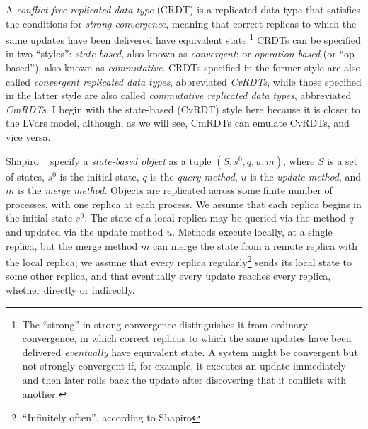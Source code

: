\documentclass{article}
\begin{document}
A \emph{conflict-free replicated data type} (CRDT) is a replicated
data type that satisfies the conditions for \emph{strong convergence},
meaning that correct replicas to which the same updates have been
delivered have equivalent state.\footnote{The ``strong'' in strong
  convergence distinguishes it from ordinary convergence, in which
  correct replicas to which the same updates have been delivered
  \emph{eventually} have equivalent state.  A system might be
  convergent but not strongly convergent if, for example, it executes
  an update immediately and then later rolls back the update after
  discovering that it conflicts with another.}  CRDTs can be specified
in two ``styles'': \emph{state-based}, also known as
\emph{convergent}; or \emph{operation-based} (or ``op-based''), also
known as \emph{commutative}.  CRDTs specified in the former style are
also called \emph{convergent replicated data types}, abbreviated
\emph{CvRDTs}, while those specified in the latter style are also
called \emph{commutative replicated data types}, abbreviated
\emph{CmRDTs}.  I begin with the state-based (CvRDT) style here
because it is closer to the LVars model, although, as we will see,
CmRDTs can emulate CvRDTs, and vice versa.

Shapiro \etal~\cite{crdts, crdts-tr} specify a \emph{state-based
  object} as a tuple $(S, s^0, q, u, m)$, where $S$ is a set of
states, $s^0$ is the initial state, $q$ is the \emph{query method},
$u$ is the \emph{update method}, and $m$ is the \emph{merge method}.
Objects are replicated across some finite number of processes, with
one replica at each process.  We assume that each replica begins in
the initial state $s^0$.  The state of a local replica may be queried
via the method $q$ and updated via the update method $u$.  Methods
execute locally, at a single replica, but the merge method $m$ can
merge the state from a remote replica with the local replica; we
assume that every replica regularly\footnote{``Infinitely often'',
  according to Shapiro \etal} sends its local state to some other
replica, and that eventually every update reaches every replica,
whether directly or indirectly.
\end{document}
